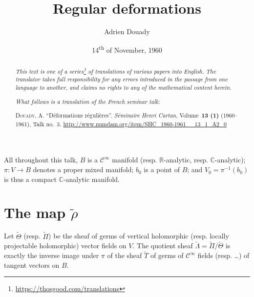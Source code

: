 \documentclass{article}
\title{Regular deformations}
\author{Adrien Douady}
\date{14\textsuperscript{th} of November, 1960}
\newcommand{\doctype}{French seminar talk}
\newcommand{\origcit}{%
  \textsc{Douady, A.}
  ``D\'{e}formations r\'{e}guli\`{e}res''.
  \emph{S\'{e}minaire Henri Cartan}, Volume~\textbf{13 (1)} (1960--1961), Talk no.~3.
  {\url{http://www.numdam.org/item/SHC_1960-1961__13_1_A2_0}}%
}
\newcommand{\RR}{\mathbb{R}}
\newcommand{\CC}{\mathbb{C}}
\newcommand{\oldpage}[1]{\marginpar{\footnotesize$\Big\vert$ \textit{p.~#1}}}
\begin{document}
\maketitle
\thispagestyle{fancy}

\renewcommand{\abstractname}{Translator's note.}

\begin{abstract}
  \renewcommand*{\thefootnote}{\fnsymbol{footnote}}
  \emph{This text is one of a series\footnote{\url{https://thosgood.com/translations}} of translations of various papers into English.}
  \emph{The translator takes full responsibility for any errors introduced in the passage from one language to another, and claims no rights to any of the mathematical content herein.}

  \medskip
  
  \emph{What follows is a translation of the \doctype:}

  \medskip\noindent
  \origcit
\end{abstract}

\setcounter{footnote}{0}

\tableofcontents
\bigskip



\oldpage{3-01}
All throughout this talk, $B$ is a $\mathscr{C}^\infty$ manifold (resp. $\RR$-analytic, resp. $\CC$-analytic); $\pi\colon V\to B$ denotes a proper mixed manifold; $b_0$ is a point of $B$; and $V_0=\pi^{-1}(b_0)$ is thus a compact $\CC$-analytic manifold.


\section{The map \texorpdfstring{$\widetilde{\rho}$}{p}}
\label{I}

Let $\widetilde{\Theta}$ (resp. $\widetilde{\Pi}$) be the sheaf of germs of vertical holomorphic (resp. locally projectable holomorphic) vector fields on $V$.
The quotient sheaf $\widetilde{\Lambda}=\widetilde{\Pi}/\widetilde{\Theta}$ is exactly the inverse image under $\pi$ of the sheaf $\widetilde{T}$ of germs of $\mathscr{C}^\infty$ fields (resp. \ldots) of tangent vectors on $B$.
\end{document}
